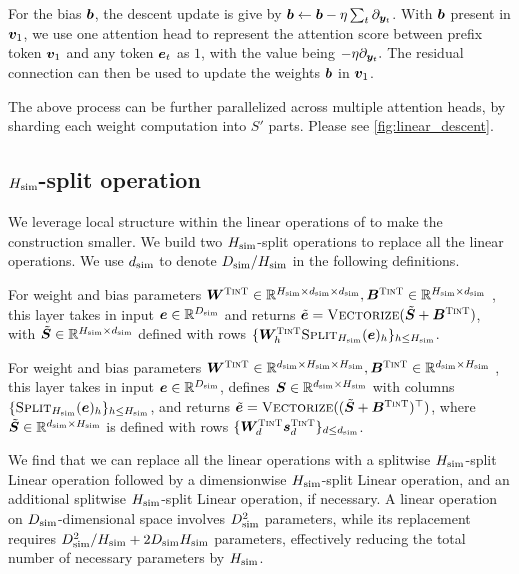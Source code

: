 For the bias ${\bm{b}}$, the descent update is give by ${\bm{b}} \gets {\bm{b}} - \eta \sum_{t} \partial_{ {\bm{y}}_t } $. With ${\bm{b}}$ present in ${\bm{v}}_1$, we use one attention head to represent the attention score between prefix token ${\bm{v}}_1$ and any token $\ve_t$ as $1$, with the value being $-\eta \partial_{{\bm{y}}_t}.$ The residual connection can then be used to update the weights ${\bm{b}}$ in ${\bm{v}}_1$. 


The above process can be further parallelized across multiple attention heads, by sharding each weight computation into $S'$ parts. Please see \cref{fig:linear_descent}.



\subsection{$H_{\text{sim}}$-split operation} \label{sec:H-split_operation_app}

We leverage local structure within the linear operations of \simulator{} to make the construction smaller. 
We build two $H_{\text{sim}}$-split operations to replace all the linear operations. We use $d_{\text{sim}}$ to denote $D_{\text{sim}}/H_{\text{sim}}$ in the following definitions. 
\begin{definition}
    For weight and bias parameters ${{\bm{W}}}^{\textsc{TinT}} \in \mathbb{R}^{H_{\text{sim}} \times d_{\text{sim}}  \times d_{\text{sim}}}, {{\bm{B}}}^{\textsc{TinT}} \in \mathbb{R}^{H_{\text{sim}} \times d_{\text{sim}}}$ , this layer takes in input $\ve \in \RR^{\simu{D}}$ and returns $\Tilde{\ve} = \attmerge( \Tilde{\mS}  + \simuw{\mB} )$, with $\Tilde{{\bm{S}}} \in \mathbb{R}^{H_{\text{sim}} \times d_{\text{sim}}} $ defined with rows $ \{ \simuw{\mW}_h \attsplit_{\simu{H}}(\ve)_h \}_ {h \le \simu{H} }$. 
\end{definition}

\begin{definition}
    For weight and bias parameters ${{\bm{W}}}^{\textsc{TinT}} \in \mathbb{R}^{d_{\text{sim}} \times H_{\text{sim}} \times H_{\text{sim}}}, {{\bm{B}}}^{\textsc{TinT}} \in \mathbb{R}^{d_{\text{sim}} \times H_{\text{sim}}}$ , this layer takes in input $\ve \in \RR^{\simu{D}}$, defines ${\bm{S}} \in \mathbb{R}^{d_{\text{sim}} \times H_{\text{sim}} }$ with columns $\{ \attsplit_{\simu{H}}(\ve)_h \}_{ h \le \simu{H} }$, and returns $\Tilde{\ve} = \attmerge( (\Tilde{\mS} + \simuw{\mB})^{\top} )$, where $\Tilde{{\bm{S}}} \in \mathbb{R}^{d_{\text{sim}} \times H_{\text{sim}}} $ is defined with rows $ \{ {{\bm{W}}}^{\textsc{TinT}}_d {{\bm{s}}}^{\textsc{TinT}}_d \}_ {d \le d_{\text{sim}} }$.
\end{definition}


We find that we can replace all the linear operations with a splitwise $H_{\text{sim}}$-split Linear operation followed by a dimensionwise $H_{\text{sim}}$-split Linear operation, and an additional splitwise $H_{\text{sim}}$-split Linear operation, if necessary. A linear operation on $D_{\text{sim}}$-dimensional space involves $D_{\text{sim}}^2$ parameters, while its replacement requires $D_{\text{sim}}^2/H_{\text{sim}} + 2D_{\text{sim}}H_{\text{sim}}$ parameters, effectively reducing the total number of necessary parameters by $H_{\text{sim}}$.



